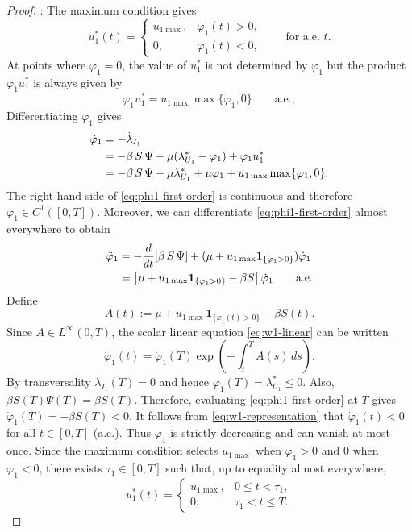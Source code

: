\documentclass[10pt,a4paper]{amsart}
\begin{document}
\begin{proof}:
The maximum condition gives
\[
u_1^*(t)
=
\begin{cases}
u_{1\max}, & \varphi_1(t)>0,\\
0, & \varphi_1(t)<0,
\end{cases}
\qquad\text{for a.e. }t.
\]
At points where \(\varphi_1=0\), the value of \(u_1^*\) is not determined by \(\varphi_1\) but the product \(\varphi_1u_1^*\) is always given by \begin{equation}
\label{eq:phi1-u1-product}
\varphi_1u_1^*
=
u_{1\max}\max\{\varphi_1,0\}
\qquad\text{a.e.},
\end{equation}
Differentiating $\varphi_1$ gives
\begin{align}
\dot\varphi_1
&=
-\dot\lambda_{I_1}\notag\\
&=
-\beta\, S\, \Psi-\mu(\lambda_{U_1}^*-\varphi_1)+\varphi_1u_1^*\notag\\
&=
-\beta\, S\, \Psi-\mu \lambda_{U_1}^*+\mu\varphi_1
+u_{1\max}\max\{\varphi_1,0\}.
\label{eq:phi1-first-order}
\end{align}
The right-hand side of \eqref{eq:phi1-first-order} is continuous and therefore \(\varphi_1\in C^1([0,T])\). Moreover, we can differentiate \eqref{eq:phi1-first-order} almost everywhere to obtain
\begin{align}
\ddot \varphi_1
&=
-\frac{d}{dt}[\beta\, S\, \Psi]+(\mu+u_{1\max}\mathbf{1}_{\{\varphi_1>0\}})\dot \varphi_1\notag\\
&=
\left[
\mu
+u_{1\max}\mathbf 1_{\{\varphi_1>0\}}
-\beta S
\right]\dot \varphi_1
\qquad\text{a.e.}
\label{eq:w1-linear}
\end{align}
Define
\[
A(t)
:=
\mu
+u_{1\max}\mathbf 1_{\{\varphi_1(t)>0\}}
-\beta S(t).
\]
Since \(A\in L^\infty(0,T)\), the scalar linear equation
\eqref{eq:w1-linear} can be written
\begin{equation}
\label{eq:w1-representation}
\dot \varphi_1(t)
=
\dot \varphi_1(T)
\exp\left(
-\int_t^T A(s)\,ds
\right).
\end{equation}
By transversality $\lambda_{I_1}(T)=0$ and hence $\varphi_1(T)=\lambda_{U_1}^*\leq 0$. Also, $\beta S(T)\Psi(T)=\beta S(T)$. Therefore, evaluating \eqref{eq:phi1-first-order} at \(T\) gives $\dot \varphi_1(T)=-\beta S(T)<0$. It follows from \eqref{eq:w1-representation} that $\dot\varphi_1(t)<0$ for all $t\in[0,T]$ (a.e.). Thus \(\varphi_1\) is strictly decreasing and can vanish at most once. Since the maximum condition selects \(u_{1\max}\) when
\(\varphi_1>0\) and \(0\) when \(\varphi_1<0\), there exists
\(\tau_1\in[0,T]\) such that, up to equality almost everywhere,
\[
u_1^*(t)
=
\begin{cases}
u_{1\max}, & 0\leq t<\tau_1,\\
0, & \tau_1<t\leq T.
\end{cases}
\]
\end{proof}
\end{document}
